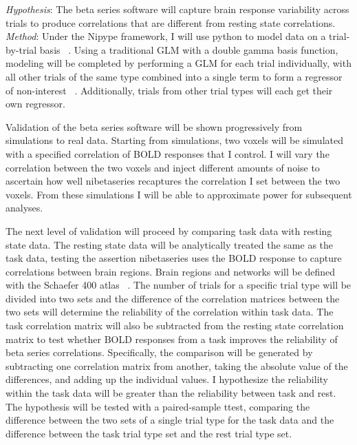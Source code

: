\documentclass[phd,appendix,figures]{uithesis}
\begin{document}
\newline
\newline
\textit{Hypothesis}:
The beta series software will capture brain response variability across trials to produce correlations that are different from resting state correlations.
\newline
\newline
\textit{Method}:
Under the Nipype framework, I will use python to model data on a trial-by-trial basis ~\citep{Smith2004,Gorgolewski2017}. 
Using a traditional GLM with a double gamma basis function, modeling will be completed by performing a GLM for each trial individually, with all other trials of the same type combined into a single term to form a regressor of non-interest ~\citep{Mumford2012}.
Additionally, trials from other trial types will each get their own regressor.

Validation of the beta series software will be shown progressively from simulations to real data.
Starting from simulations, two voxels will be simulated with a specified correlation of BOLD responses that I control.
I will vary the correlation between the two voxels and inject different amounts of noise to ascertain how well nibetaseries recaptures the correlation I set between the two voxels.
From these simulations I will be able to approximate power for subsequent analyses.
 
The next level of validation will proceed by comparing task data with resting state data.
The resting state data will be analytically treated the same as the task data, testing the assertion nibetaseries uses the BOLD response to capture correlations between brain regions.
Brain regions and networks will be defined with the Schaefer 400 atlas ~\citep{schaefer2017}.
The number of trials for a specific trial type will be divided into two sets and the difference of the correlation matrices between the two sets will determine the reliability of the correlation within task data.
The task correlation matrix will also be subtracted from the resting state correlation matrix to test whether BOLD responses from a task improves the reliability of beta series correlations.
Specifically, the comparison will be generated by subtracting one correlation matrix from another, taking the absolute value of the differences, and adding up the individual values.
I hypothesize the reliability within the task data will be greater than the reliability between task and rest.
The hypothesis will be tested with a paired-sample ttest, comparing the difference between the two sets of a single trial type for the task data and the difference between the task trial type set and the rest trial type set.
 
\end{document}
